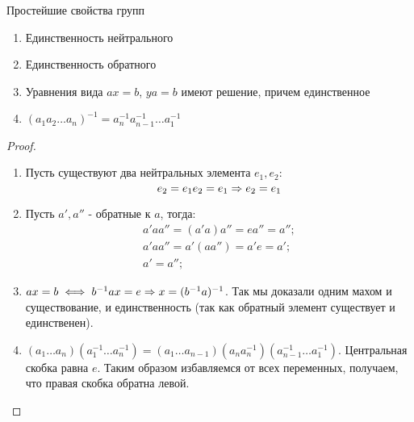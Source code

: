 \begin{theorem}{Простейшие свойства групп}
	\begin{enumerate}
		\item Единственность нейтрального
		\item Единственность обратного
		\item 
			Уравнения вида $ax=b$, $ya=b$ имеют решение, причем единственное
		\item $(a_1 a_2 \dots a_n)^{-1} = a_n^{-1} a_{n-1}^{-1} \dots a_1^{-1}$
   	\end{enumerate}
\end{theorem}
\begin{proof}
	\begin{enumerate}
		\item
			Пусть существуют два нейтральных элемента $e_1, e_2$:
			\[e_2 = e_1 e_2 = e_1 \Rightarrow e_2 = e_1\]
		\item
			Пусть $a', a''$ - обратные к $a$, тогда:
			\begin{gather*}
			a'aa'' = (a'a)a''= ea'' = a''; \\
			a'aa'' = a'(aa'') = a'e = a'; \\
			a' = a'';
			\end{gather*}
		\item
			$ax = b \iff b^{-1}ax = e \Rightarrow x = (b^{-1}a)^{-1}$.
			Так мы доказали одним махом и существование, и единственность (так как обратный элемент существует и единственен).
		\item
			$(a_1 \dots a_n) (a_1^{-1} \dots a_n^{-1}) = (a_1 \dots a_{n-1})(a_n a_n^{-1})(a_{n-1}^{-1} \dots a_1^{-1})$.
			Центральная скобка равна $e$. Таким образом избавляемся от всех переменных, получаем, что правая скобка обратна левой. 
	\end{enumerate}
\end{proof}
	
